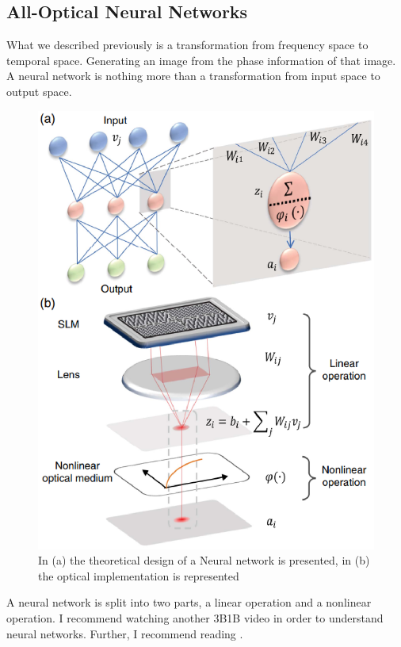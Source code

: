 \documentclass{article}
\begin{document}
\subsection{All-Optical Neural Networks}
What we described previously is a transformation from frequency space to temporal space. Generating an image from the phase information of that image.
A neural network is nothing more than a transformation from input space to output space.

\begin{figure}[!phbt]
    \centering
    \includegraphics[width=0.55\linewidth]{img/AONN.eps}
    \caption{In (a) the theoretical design of a Neural network is presented, in (b) the optical implementation is represented}
    \label{fig:AONN}
\end{figure}

A neural network is split into two parts, a linear operation and a nonlinear operation.
I recommend watching another 3B1B video in order to understand neural networks. Further, I recommend reading \cite{AONNHongKong}.
\begin{figure}[!phbt]
    \centering
    \href{https://youtu.be/aircAruvnKk}{
    }
\end{figure}

\end{document}
